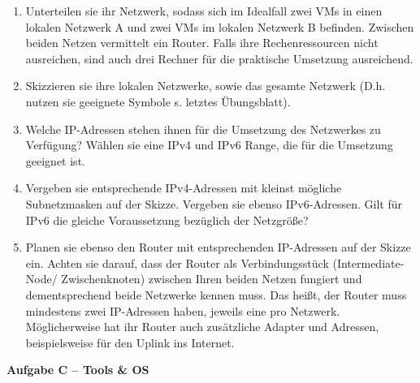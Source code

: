 \documentclass[paper=a4,fontsize=11pt]{scrartcl}%
\numberwithin{equation}{section}
\begin{document}
\begin{enumerate}
	\begin{enumerate}
		\item Unterteilen sie ihr Netzwerk, sodass sich im Idealfall zwei VMs in einen lokalen Netzwerk A und zwei VMs im lokalen Netzwerk B befinden. Zwischen beiden Netzen vermittelt ein Router. Falls ihre Rechenressourcen nicht ausreichen, sind auch drei Rechner für die praktische Umsetzung ausreichend.
		\item Skizzieren sie ihre lokalen Netzwerke, sowie das gesamte Netzwerk (D.h. nutzen sie geeignete Symbole s. letztes Übungsblatt).
		\item Welche IP-Adressen stehen ihnen für die Umsetzung des Netzwerkes zu Verfügung? Wählen sie eine IPv4 und IPv6 Range, die für die Umsetzung geeignet ist.
		\item Vergeben sie entsprechende IPv4-Adressen mit kleinst mögliche Subnetzmasken auf der Skizze. Vergeben sie ebenso IPv6-Adressen. Gilt für IPv6 die gleiche Voraussetzung bezüglich der Netzgröße?
		\item Planen sie ebenso den Router mit entsprechenden IP-Adressen auf der Skizze ein. Achten sie darauf, dass der Router als Verbindungsstück (Intermediate-Node/ Zwischenknoten) zwischen Ihren beiden Netzen fungiert und dementsprechend beide Netzwerke kennen muss. Das heißt, der Router muss mindestens zwei IP-Adressen haben, jeweils eine pro Netzwerk. Möglicherweise hat ihr Router auch zusätzliche Adapter und Adressen, beispielsweise für den Uplink ins Internet.
	\end{enumerate}
\end{enumerate}

\begin{center}
\Large{\textbf{Aufgabe C -- Tools \& OS}}
\end{center}
\vskip0.25in
\end{document}
